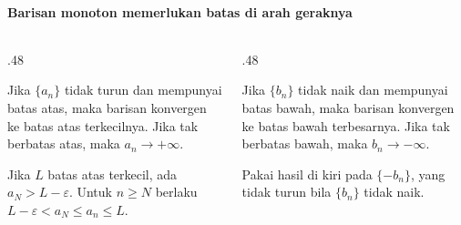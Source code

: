 \documentclass{../../kalkulus-ppt}
\begin{document}
\begin{frame}{\insertsection}
    \framesubtitle{Barisan monoton memerlukan batas di arah geraknya}
    \begin{columns}[T,onlytextwidth]
        \begin{column}{.48\textwidth}
            \begin{teorema}
                Jika $\{a_n\}$ tidak turun dan mempunyai batas
                atas, maka barisan konvergen ke batas atas terkecilnya.
                Jika tak berbatas atas, maka $a_n\to+\infty$.
            \end{teorema}
            Jika $L$ batas atas terkecil, ada $a_N>L-\varepsilon$.
            Untuk $n\ge N$ berlaku $L-\varepsilon<a_N\le a_n\le L$.
        \end{column}
        \begin{column}{.48\textwidth}
            \begin{teorema}
                Jika $\{b_n\}$ tidak naik dan mempunyai batas
                bawah, maka barisan konvergen ke batas bawah terbesarnya.
                Jika tak berbatas bawah, maka $b_n\to-\infty$.
            \end{teorema}
            Pakai hasil di kiri pada $\{-b_n\}$, yang tidak turun
            bila $\{b_n\}$ tidak naik.
        \end{column}
    \end{columns}
    \smallskip
\end{frame}
\end{document}
